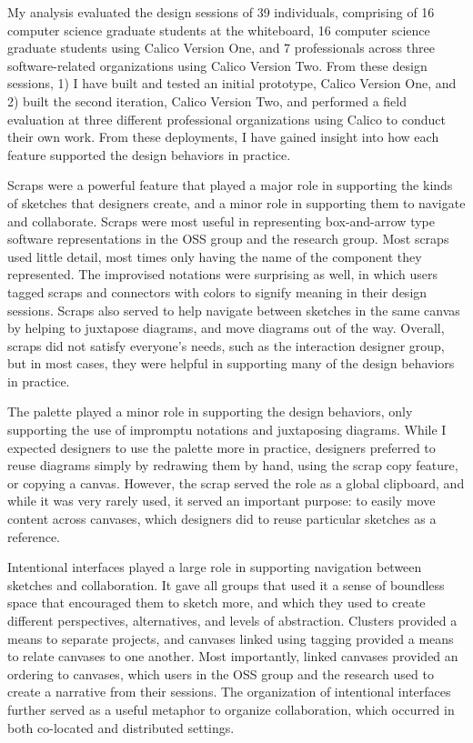 \documentclass[12pt,fleqn]{ucithesis}
\begin{document}
My analysis evaluated the design sessions of 39 individuals, comprising of 16 computer science graduate students at the whiteboard, 16 computer science graduate students using Calico Version One, and 7 professionals across three software-related organizations using Calico Version Two. From these design sessions, 1) I have built and tested an initial prototype, Calico Version One, and 2) built the second iteration, Calico Version Two, and performed a field evaluation at three different professional organizations using Calico to conduct their own work. From these deployments, I have gained insight into how each feature supported the design behaviors in practice.

Scraps were a powerful feature that played a major role in supporting the kinds of sketches that designers create, and a minor role in supporting them to navigate and collaborate. Scraps were most useful in representing box-and-arrow type software representations in the OSS group and the research group. Most scraps used little detail, most times only having the name of the component they represented. The improvised notations were surprising as well, in which users tagged scraps and connectors with colors to signify meaning in their design sessions. Scraps also served to help navigate between sketches in the same canvas by helping to juxtapose diagrams, and move diagrams out of the way. Overall, scraps did not satisfy everyone's needs, such as the interaction designer group, but in most cases, they were helpful in supporting many of the design behaviors in practice.

The palette played a minor role in supporting the design behaviors, only supporting the use of impromptu notations and juxtaposing diagrams. While I expected designers to use the palette more in practice, designers preferred to reuse diagrams simply by redrawing them by hand, using the scrap copy feature, or copying a canvas. However, the scrap served the role as a global clipboard, and while it was very rarely used, it served an important purpose: to easily move content across canvases, which designers did to reuse particular sketches as a reference.

Intentional interfaces played a large role in supporting navigation between sketches and collaboration. It gave all groups that used it a sense of boundless space that encouraged them to sketch more, and which they used to create different perspectives, alternatives, and levels of abstraction. Clusters provided a means to separate projects, and canvases linked using tagging provided a means to relate canvases to one another. Most importantly, linked canvases provided an ordering to canvases, which users in the OSS group and the research used to create a narrative from their sessions. The organization of intentional interfaces further served as a useful metaphor to organize collaboration, which occurred in both co-located and distributed settings.
\end{document}
